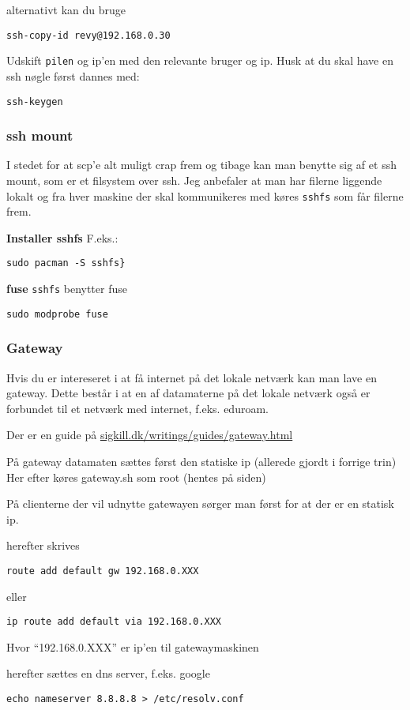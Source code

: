 \documentclass[10pt,a4paper,danish]{article}
\begin{document}
alternativt kan du bruge
\begin{verbatim}
ssh-copy-id revy@192.168.0.30
\end{verbatim}
Udskift \texttt{pilen} og ip'en med den relevante bruger og ip.
Husk at du skal have en ssh nøgle først
dannes med:

\texttt{ssh-keygen}

\subsubsection{ssh mount}
I stedet for at scp'e alt muligt crap frem og tibage kan man benytte sig af et
ssh mount, som er et filsystem over ssh.
Jeg anbefaler at man har filerne liggende lokalt og fra hver maskine der skal
kommunikeres med køres \texttt{sshfs} som får filerne frem.

\textbf{Installer sshfs}
F.eks.:
\begin{verbatim}
sudo pacman -S sshfs}
\end{verbatim}

\textbf{fuse}
\texttt{sshfs} benytter fuse
\begin{verbatim}
sudo modprobe fuse
\end{verbatim}
\subsubsection{Gateway}
Hvis du er intereseret i at få internet på det lokale netværk kan man lave en
gateway.
Dette består i at en af datamaterne på det lokale netværk også er forbundet til
et netværk med internet, f.eks. eduroam.

Der er en guide på \url{sigkill.dk/writings/guides/gateway.html}

På gateway datamaten sættes først den statiske ip (allerede gjordt i forrige
trin)
Her efter køres gateway.sh som root (hentes på siden)

På clienterne der vil udnytte gatewayen sørger man først for at der er en
statisk ip.

herefter skrives
\begin{verbatim}
route add default gw 192.168.0.XXX
\end{verbatim}

eller
\begin{verbatim}
ip route add default via 192.168.0.XXX
\end{verbatim}
Hvor ``192.168.0.XXX'' er ip'en til gatewaymaskinen

herefter sættes en dns server, f.eks. google
\begin{verbatim}
echo nameserver 8.8.8.8 > /etc/resolv.conf
\end{verbatim}
\end{document}
